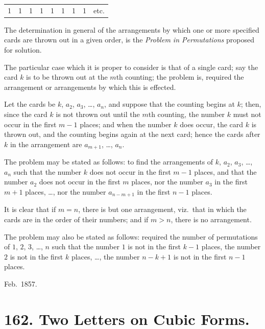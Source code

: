 \documentclass[12pt,a4paper]{article}
\theoremstyle{plain}
\begin{document}
\begin{center}
\begin{tabular}{ccccccccc}
1 & 1 & 1 & 1 & 1 & 1 & 1 & 1 & etc.
\end{tabular}
\end{center}

The determination in general of the arrangements by which one or more specified cards are thrown out in a given order, is the \textit{Problem in Permutations} proposed for solution.

The particular case which it is proper to consider is that of a single card; say the card $k$ is to be thrown out at the $m$th counting; the problem is, required the arrangement or arrangements by which this is effected.

Let the cards be $k$, $a_2$, $a_3$, \ldots, $a_n$, and suppose that the counting begins at $k$; then, since the card $k$ is not thrown out until the $m$th counting, the number $k$ must not occur in the first $m-1$ places; and when the number $k$ does occur, the card $k$ is thrown out, and the counting begins again at the next card; hence the cards after $k$ in the arrangement are $a_{m+1}$, \ldots, $a_n$.

The problem may be stated as follows: to find the arrangements of $k$, $a_2$, $a_3$, \ldots, $a_n$ such that the number $k$ does not occur in the first $m-1$ places, and that the number $a_2$ does not occur in the first $m$ places, nor the number $a_3$ in the first $m+1$ places, \ldots, nor the number $a_{n-m+1}$ in the first $n-1$ places.

It is clear that if $m=n$, there is but one arrangement, viz.\ that in which the cards are in the order of their numbers; and if $m>n$, there is no arrangement.

The problem may also be stated as follows: required the number of permutations of $1$, $2$, $3$, \ldots, $n$ such that the number $1$ is not in the first $k-1$ places, the number $2$ is not in the first $k$ places, \ldots, the number $n-k+1$ is not in the first $n-1$ places.

\begin{flushright}
Feb.~1857.
\end{flushright}

\clearpage

\section*{162. Two Letters on Cubic Forms.}
\end{document}
